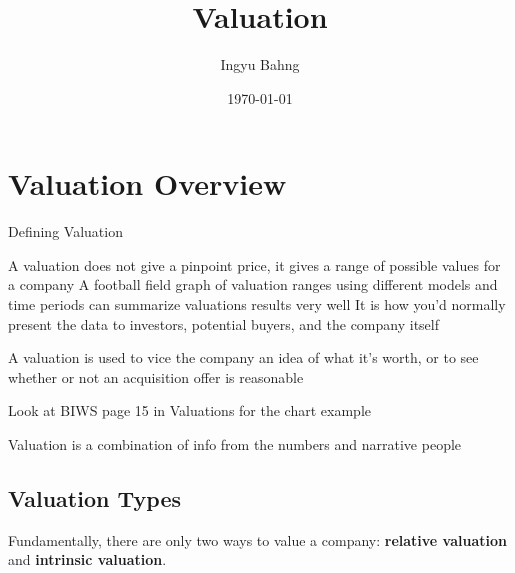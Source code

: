 \documentclass[10pt]{article}
\title{Valuation}
\date{\today}
\author{Ingyu Bahng}
\begin{document}



\section{Valuation Overview}

  \begin{core}{Defining Valuation}

    A valuation does not give a pinpoint price, it gives a range of possible values for a company
    A football field graph of valuation ranges using different models and time periods can summarize valuations results very well
    It is how you’d normally present the data to investors, potential buyers, and the company itself

    A valuation is used to vice the company an idea of what it’s worth, or to see whether or not an acquisition offer is reasonable

    Look at BIWS page 15 in Valuations for the chart example

    Valuation is a combination of info from the numbers and narrative people

  \end{core}

  \subsection{Valuation Types}

    Fundamentally, there are only two ways to value a company: \textbf{relative valuation} and \textbf{intrinsic valuation}.
\end{document}
